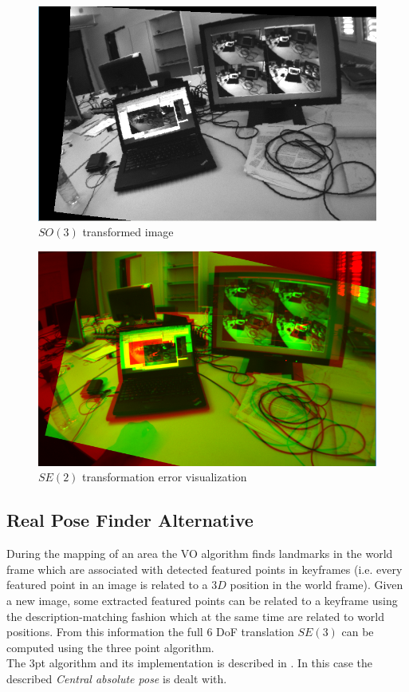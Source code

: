 \begin{figure}[htpb]
  \centering
  \includegraphics[width=0.6\linewidth]{img/so3_transformation_1.png}
  \caption{$SO(3)$ transformed image}
  \label{fig:so3_transformation_1}
\end{figure}

\begin{figure}[htpb]
  \centering
  \includegraphics[width=0.6\linewidth]{img/se2_error_1.png}
  \caption{$SE(2)$ transformation error visualization}
  \label{fig:se3_error_1}
\end{figure}


\subsection{Real Pose Finder Alternative}
\label{sub:real_pose_finder_alternative}

During the mapping of an area the VO algorithm finds landmarks in the world frame which are associated with detected featured points in keyframes (i.e. every featured point in an image is related to a $3D$ position in the world frame). Given a new image, some extracted featured points can be related to a keyframe using the description-matching fashion which at the same time are related to world positions. From this information the full 6 DoF translation $SE(3)$ can be computed using the three point algorithm.\\

The 3pt algorithm and its implementation is described in \cite{kneipopengv}. In this case the described \textit{Central absolute pose} is dealt with.

